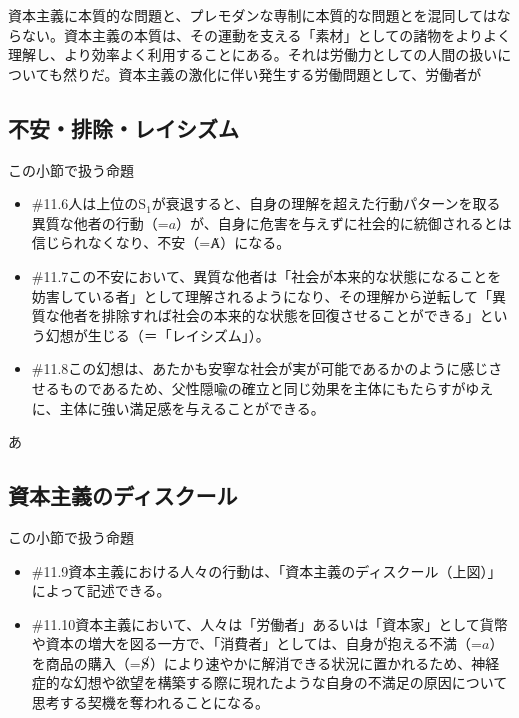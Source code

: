 資本主義に本質的な問題と、プレモダンな専制に本質的な問題とを混同してはならない。資本主義の本質は、その運動を支える「素材」としての諸物をよりよく理解し、より効率よく利用することにある。それは労働力としての人間の扱いについても然りだ。資本主義の激化に伴い発生する労働問題として、労働者が

\subsection{不安・排除・レイシズム}\label{ux4e0dux5b89ux6392ux9664ux30ecux30a4ux30b7ux30baux30e0}

\begin{note}{この小節で扱う命題}
  \begin{itemize}
    \tightlist
    \item{\#11.6}人は上位の$\textrm{S}_1$が衰退すると、自身の理解を超えた行動パターンを取る異質な他者の行動（=$a$）が、自身に危害を与えずに社会的に統御されるとは信じられなくなり、不安（=Ⱥ）になる。
    \item{\#11.7}この不安において、異質な他者は「社会が本来的な状態になることを妨害している者」として理解されるようになり、その理解から逆転して「異質な他者を排除すれば社会の本来的な状態を回復させることができる」という幻想が生じる（＝「レイシズム」）。
    \item{\#11.8}この幻想は、あたかも安寧な社会が実が可能であるかのように感じさせるものであるため、父性隠喩の確立と同じ効果を主体にもたらすがゆえに、主体に強い満足感を与えることができる。
  \end{itemize}
\end{note}

あ

\subsection{資本主義のディスクール}\label{ux8cc7ux672cux4e3bux7fa9ux306eux30c7ux30a3ux30b9ux30afux30fcux30eb}

\begin{note}{この小節で扱う命題}
  \begin{itemize}
    \tightlist
    \item{\#11.9}資本主義における人々の行動は、「資本主義のディスクール（上図）」によって記述できる。
    \item{\#11.10}資本主義において、人々は「労働者」あるいは「資本家」として貨幣や資本の増大を図る一方で、「消費者」としては、自身が抱える不満（=$a$）を商品の購入（=$\cancel{\textrm{S}}$）により速やかに解消できる状況に置かれるため、神経症的な幻想や欲望を構築する際に現れたような自身の不満足の原因について思考する契機を奪われることになる。
  \end{itemize}
\end{note}

